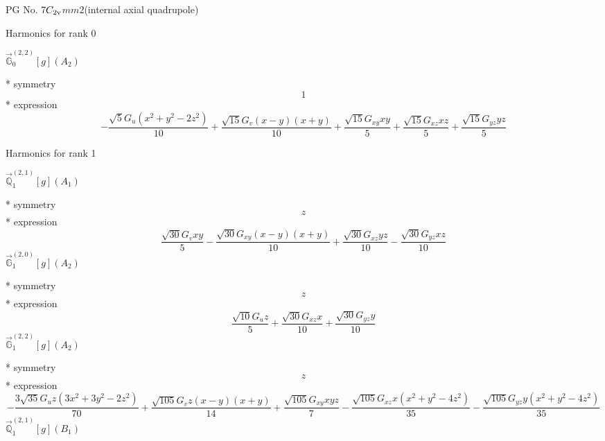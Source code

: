 \documentclass[fleqn,8pt]{jsarticle}
\begin{document}
\setcounter{MaxMatrixCols}{32}

\renewcommand{\tablename}{Table~}
\renewcommand{\figurename}{Figure~}
\begin{center}
\LARGE
PG No. 7\quad$C_{\rm 2v}$\quad$mm2$\quad[ orthorhombic ] (internal axial quadrupole)
\end{center}

\noindent * Harmonics for rank 0

\noindent\quad $\vec{\mathbb{G}}_{0}^{(2,2)}[g](A_{2})$

\noindent\quad ** symmetry
\begin{dmath*}
1
\end{dmath*}
\noindent\quad ** expression
\begin{dmath*}
- \frac{\sqrt{5} G_{u} \left(x^{2} + y^{2} - 2 z^{2}\right)}{10} + \frac{\sqrt{15} G_{v} \left(x - y\right) \left(x + y\right)}{10} + \frac{\sqrt{15} G_{xy} x y}{5} + \frac{\sqrt{15} G_{xz} x z}{5} + \frac{\sqrt{15} G_{yz} y z}{5}
\end{dmath*}

\noindent * Harmonics for rank 1

\noindent\quad $\vec{\mathbb{Q}}_{1}^{(2,1)}[g](A_{1})$

\noindent\quad ** symmetry
\begin{dmath*}
z
\end{dmath*}
\noindent\quad ** expression
\begin{dmath*}
\frac{\sqrt{30} G_{v} x y}{5} - \frac{\sqrt{30} G_{xy} \left(x - y\right) \left(x + y\right)}{10} + \frac{\sqrt{30} G_{xz} y z}{10} - \frac{\sqrt{30} G_{yz} x z}{10}
\end{dmath*}
\noindent\quad $\vec{\mathbb{G}}_{1}^{(2,0)}[g](A_{2})$

\noindent\quad ** symmetry
\begin{dmath*}
z
\end{dmath*}
\noindent\quad ** expression
\begin{dmath*}
\frac{\sqrt{10} G_{u} z}{5} + \frac{\sqrt{30} G_{xz} x}{10} + \frac{\sqrt{30} G_{yz} y}{10}
\end{dmath*}
\noindent\quad $\vec{\mathbb{G}}_{1}^{(2,2)}[g](A_{2})$

\noindent\quad ** symmetry
\begin{dmath*}
z
\end{dmath*}
\noindent\quad ** expression
\begin{dmath*}
- \frac{3 \sqrt{35} G_{u} z \left(3 x^{2} + 3 y^{2} - 2 z^{2}\right)}{70} + \frac{\sqrt{105} G_{v} z \left(x - y\right) \left(x + y\right)}{14} + \frac{\sqrt{105} G_{xy} x y z}{7} - \frac{\sqrt{105} G_{xz} x \left(x^{2} + y^{2} - 4 z^{2}\right)}{35} - \frac{\sqrt{105} G_{yz} y \left(x^{2} + y^{2} - 4 z^{2}\right)}{35}
\end{dmath*}
\noindent\quad $\vec{\mathbb{Q}}_{1}^{(2,1)}[g](B_{1})$
\end{document}
